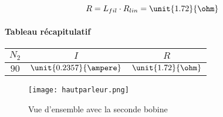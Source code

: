 $$R = L_{fil} \cdot R_{lin} = \unit{1.72}{\ohm}$$


\paragraph{Tableau récapitulatif}

\begin{center}
	\begin{tabular}{c|c|c}
		$N_2$ & $I$ & $R$ \\
		\hline
		 $90$ & $\unit{0.2357}{\ampere}$ & $\unit{1.72}{\ohm}$
	\end{tabular}
\end{center}

\begin{figure}[ht!]
\centering
\texttt{[image: hautparleur.png]}
\caption{Vue d'ensemble avec la seconde bobine}
\label{Vue d'ensemble avec la seconde bobine}
\end{figure}


